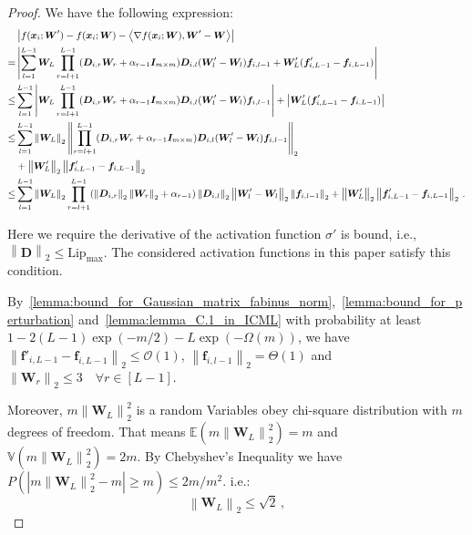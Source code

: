 \documentclass[nohyperref]{article}
\theoremstyle{plain}
\theoremstyle{definition}
\theoremstyle{remark}
\begin{document}
\begin{proof}
\label{proof:lemma_4.1_in_GuQuanquan}
We have the following expression:
\begin{equation}
\small
\begin{split}
    & \left | f(\bm {x}_i;\bm{W}') - f(\bm {x}_i;\bm{W}) - \left \langle \nabla  f(\bm {x}_i;\bm{W}), \bm{W}' -\bm{W}  \right \rangle \right | \\
    = & \left |\sum_{l=1}^{L-1}\bm{W}_{L}\prod_{r=l+1}^{L-1}(\bm{D}_{i,r}\bm{W}_r+\alpha_{r-1}\bm{I}_{m\times m})\bm{D}_{i,l}(\bm{W}'_l-\bm{W}_l)\bm{f}_{i,l-1}+\bm{W}'_L(\bm{f}'_{i,L-1}-\bm{f}_{i,L-1})  \right |\\
    \leq & \sum_{l=1}^{L-1}\left |\bm{W}_{L}\prod_{r=l+1}^{L-1}(\bm{D}_{i,r}\bm{W}_r +\alpha_{r-1}\bm{I}_{m\times m})\bm{D}_{i,l}(\bm{W}'_l-\bm{W}_l)\bm{f}_{i,l-1}\right |+\left | \bm{W}'_L(\bm{f}'_{i,L-1}-\bm{f}_{i,L-1})   \right |\\\leq & \sum_{l=1}^{L-1}\left \| \bm{W}_{L} \right \|_2\left \|  \prod_{r=l+1}^{L-1}(\bm{D}_{i,r}\bm{W}_r +\alpha_{r-1}\bm{I}_{m\times m})\bm{D}_{i,l}(\bm{W}'_l-\bm{W}_l)\bm{f}_{i,l-1} \right \|_2 \\
    & +\left \| \bm{W}'_L\right \|_2\left \| \bm{f}'_{i,L-1}-\bm{f}_{i,L-1} \right \|_2 \\\leq & \sum_{l=1}^{L-1}\left \| \bm{W}_{L} \right \|_2  \prod_{r=l+1}^{L-1}(\left \|  \bm{D}_{i,r}\right \|_2\left \|\bm{W}_r\right \|_2 +\alpha_{r-1})\left \|  \bm{D}_{i,l}\right \|_2\left \| \bm{W}'_l-\bm{W}_l \right \|_2 \left \|\bm{f}_{i,l-1} \right \|_2 +\left \| \bm{W}'_L\right \|_2\left \| \bm{f}'_{i,L-1}-\bm{f}_{i,L-1} \right \|_2\,.
\end{split}
\label{eq:proof_lemma_4.1_in_GuQuanquan_1}
\end{equation}

Here we require the derivative of the activation function ${\sigma}'$ is bound, i.e., $\left \|\bm{D}\right \|_2 \leq \mathrm{Lip}_{\max}$.
The considered activation functions in this paper satisfy this condition.

By~\cref{lemma:bound_for_Gaussian_matrix_fabinus_norm},~\cref{lemma:bound_for_perturbation} and~\cref{lemma:lemma_C.1_in_ICML} with probability at least $1-2(L-1)\exp(-m/2)-L\exp(-\Omega (m))$, we have $\left \| \bm{f}'_{i,L-1}-\bm{f}_{i,L-1} \right \|_2 \leq \mathcal{O}(1)$, $\left \|\bm{f}_{i,l-1} \right \|_2 = \Theta(1)$ and $\left \|\bm{W}_r\right \|_2 \leq 3 \quad \forall r \in [L-1]$.

Moreover, $m\left \| \bm{W}_{L} \right \|_2^2$ is a random Variables obey chi-square distribution with $m$ degrees of freedom. That means $\mathbb{E} (m\left \| \bm{W}_{L} \right \|_2^2)=m$ and $\mathbb{V}(m\left \| \bm{W}_{L} \right \|_2^2)=2m$. By Chebyshev's Inequality we have $P(|m\left \| \bm{W}_{L} \right \|_2^2-m|\geq m)\leq 2m/m^{2}$. i.e.:
\begin{equation*}
\left \| \bm{W}_{L} \right \|_2\leq \sqrt{2}\,,
\end{equation*}


\end{proof}
\end{document}

